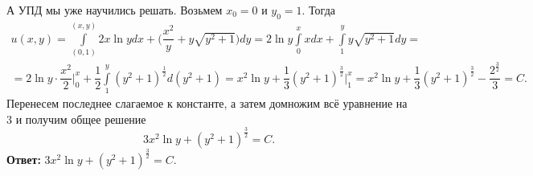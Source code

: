 \documentclass[a4paper, 12pt]{article}
\begin{document}
А УПД мы уже научились решать. Возьмем $x_0 = 0$ и $y_0 = 1$. Тогда \begin{multline*}
	u(x,y) = \int\limits^{(x,y)}_{(0,1)} 2x\ln ydx + \Big(\dfrac{x^2}{y} + y\sqrt{y^2 + 1}\Big)dy = 2\ln y\int\limits^x_0xdx + \int\limits_1^yy\sqrt{y^2 + 1}dy =\\ = 2\ln y \cdot \dfrac{x^2}{2}\Big|_0^x + \dfrac{1}{2}\int\limits_1^y(y^2 + 1)^{\frac{1}{2}}d(y^2 + 1) = x^2\ln y +\dfrac{1}{3}(y^2 + 1)^{\frac{3}{2}}\Big|_1^x =  x^2\ln y +\dfrac{1}{3}(y^2 + 1)^{\frac{3}{2}} - \dfrac{2^\frac{3}{2}}{3} = C.
\end{multline*}
Перенесем последнее слагаемое к константе, а затем домножим всё уравнение на 3 и получим общее решение $$3x^2\ln y +(y^2 + 1)^{\frac{3}{2}} = C.$$
\textbf{Ответ:} $3x^2\ln y +(y^2 + 1)^{\frac{3}{2}} = C.$
\end{document}
